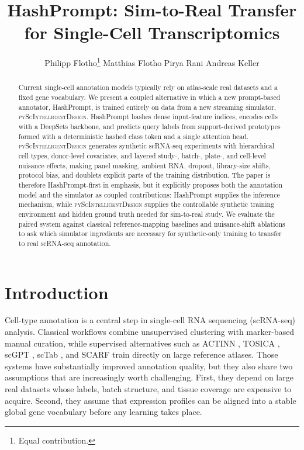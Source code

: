 \documentclass{article}
\title{HashPrompt: Sim-to-Real Transfer for Single-Cell Transcriptomics}
\author{%
  Philipp Flotho\thanks{Equal contribution.}
  \And
  Matthias Flotho\footnotemark[1]
  \And
  Pirya Rani
  \And
  Andreas Keller
}
\begin{document}
\maketitle

\begin{abstract}
Current single-cell annotation models typically rely on atlas-scale real datasets and a fixed gene vocabulary. We present a coupled alternative in which a new prompt-based annotator, HashPrompt, is trained entirely on data from a new streaming simulator, \textsc{pyScIntelligentDesign}. HashPrompt hashes dense input-feature indices, encodes cells with a DeepSets backbone, and predicts query labels from support-derived prototypes formed with a deterministic hashed class token and a single attention head. \textsc{pyScIntelligentDesign} generates synthetic scRNA-seq experiments with hierarchical cell types, donor-level covariates, and layered study-, batch-, plate-, and cell-level nuisance effects, making panel masking, ambient RNA, dropout, library-size shifts, protocol bias, and doublets explicit parts of the training distribution. The paper is therefore HashPrompt-first in emphasis, but it explicitly proposes both the annotation model and the simulator as coupled contributions: HashPrompt supplies the inference mechanism, while \textsc{pyScIntelligentDesign} supplies the controllable synthetic training environment and hidden ground truth needed for sim-to-real study. We evaluate the paired system against classical reference-mapping baselines and nuisance-shift ablations to ask which simulator ingredients are necessary for synthetic-only training to transfer to real scRNA-seq annotation.
\end{abstract}

\section{Introduction}

Cell-type annotation is a central step in single-cell RNA sequencing (scRNA-seq) analysis. Classical workflows combine unsupervised clustering with marker-based manual curation, while supervised alternatives such as ACTINN \cite{ma2020actinn}, TOSICA \cite{chen2023transformer}, scGPT \cite{cui2024scgpt}, scTab \cite{fischer2024sctab}, and SCARF \cite{liu2025scarf} train directly on large reference atlases. Those systems have substantially improved annotation quality, but they also share two assumptions that are increasingly worth challenging. First, they depend on large real datasets whose labels, batch structure, and tissue coverage are expensive to acquire. Second, they assume that expression profiles can be aligned into a stable global gene vocabulary before any learning takes place.
\end{document}
